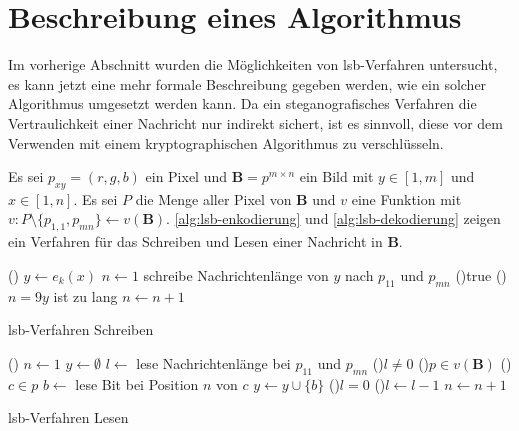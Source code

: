 \section{Beschreibung eines Algorithmus}
Im vorherige Abschnitt wurden die Möglichkeiten von \acs{lsb}-Verfahren untersucht,
es kann jetzt eine mehr formale Beschreibung gegeben werden,
wie ein solcher Algorithmus umgesetzt werden kann.
Da ein steganografisches Verfahren die Vertraulichkeit einer Nachricht
nur indirekt sichert, ist es sinnvoll, diese vor dem Verwenden mit einem
kryptographischen Algorithmus zu verschlüsseln.

\begin{definition}
  Es sei $p_{xy} = (r,g,b)$ ein Pixel und $\mathbf{B} = p^{m \times n}$ ein Bild
  mit $y \in [1, m]$ und $x \in [1, n]$. Es sei $P$ die Menge aller Pixel von $\mathbf{B}$
  und $v$ eine Funktion mit $v: P \setminus \{p_{1,1},p_{mn}\} \leftarrow v(\mathbf{B})$.
  \autoref{alg:lsb-enkodierung} und \ref{alg:lsb-dekodierung} zeigen ein Verfahren für das
  Schreiben und Lesen einer Nachricht in $\mathbf{B}$.
  \begin{algorithm}
    \DontPrintSemicolon
    \Begin(){
      $y \leftarrow e_k(x)$\;
      $n \leftarrow 1$\;
      schreibe Nachrichtenlänge von $y$ nach $p_{11}$ und $p_{mn}$\;
      \While(){true}{
        \lIf(){$n = 9$}{$y$ ist zu lang}
        $n \leftarrow n + 1$\;
      }
    }
    \caption{\acs{lsb}-Verfahren Schreiben}
    \label{alg:lsb-enkodierung}
  \end{algorithm}

  \begin{algorithm}[H]
    \DontPrintSemicolon
    \Begin(){
      $n \leftarrow 1$\;
      $y \leftarrow \emptyset$\;
      $l \leftarrow$ lese Nachrichtenlänge bei $p_{11}$ und $p_{mn}$\;
      \While(){$l \neq 0$}{
        \For(){$p \in v(\mathbf{B})$}{
          \For(){$c \in p$}{
            $b \leftarrow$ lese Bit bei Position $n$ von $c$\;
            $y \leftarrow y \cup \{b\}$\;
            \lIf(){$l = 0$} {
            }
            \lElse(){$l \leftarrow l - 1$}
          }
        }
        $n \leftarrow n + 1$\;
      }
    }
    \caption{\acs{lsb}-Verfahren Lesen}
    \label{alg:lsb-dekodierung}
  \end{algorithm}
\end{definition}

